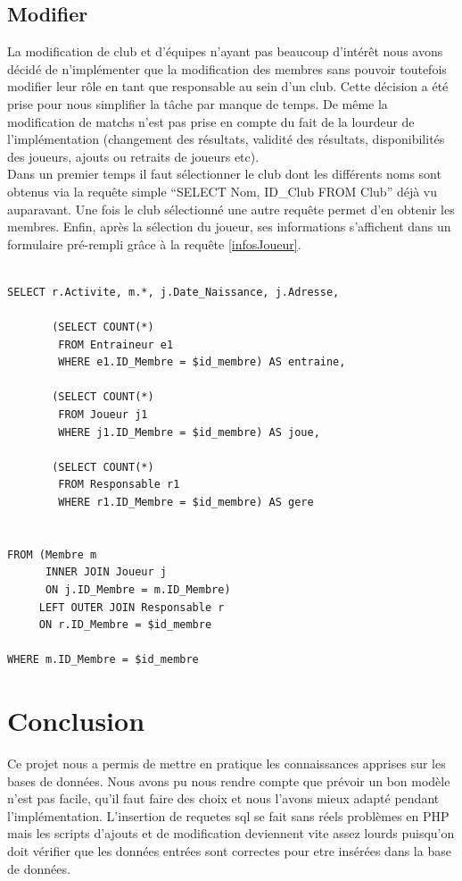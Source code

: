 \documentclass[a4paper»,8pt,french,fleqn]{report}
\begin{document}
\section{Modifier}

La modification de club et d'équipes n'ayant pas beaucoup d'intérêt nous avons décidé de n'implémenter que la modification des membres sans pouvoir toutefois modifier leur rôle en tant que responsable au sein d'un club. Cette décision a été prise pour nous simplifier la tâche par manque de temps. De même la modification de matchs n'est pas prise en compte du fait de la lourdeur de l'implémentation (changement des résultats, validité des résultats, disponibilités des joueurs, ajouts ou retraits de joueurs etc). \\

Dans un premier temps il faut sélectionner le club dont les différents noms sont obtenus via la requête simple ``SELECT Nom, ID\_Club FROM Club'' déjà vu auparavant. Une fois le club sélectionné une autre requête permet d'en obtenir les membres. Enfin, après la sélection du joueur, ses informations s'affichent dans un formulaire pré-rempli grâce à la requête \ref{infosJoueur}.

\begin{lstlisting}

SELECT r.Activite, m.*, j.Date_Naissance, j.Adresse,

       (SELECT COUNT(*) 
        FROM Entraineur e1
        WHERE e1.ID_Membre = $id_membre) AS entraine,

       (SELECT COUNT(*)
        FROM Joueur j1
        WHERE j1.ID_Membre = $id_membre) AS joue,

       (SELECT COUNT(*)
        FROM Responsable r1
        WHERE r1.ID_Membre = $id_membre) AS gere


FROM (Membre m 
      INNER JOIN Joueur j
      ON j.ID_Membre = m.ID_Membre)
     LEFT OUTER JOIN Responsable r
     ON r.ID_Membre = $id_membre
     
WHERE m.ID_Membre = $id_membre

\end{lstlisting}  

\chapter*{Conclusion}

Ce projet nous a permis de mettre en pratique les connaissances apprises sur les bases de données. Nous avons pu nous rendre compte que prévoir un bon modèle n'est pas facile, qu'il faut faire des choix et nous l'avons mieux adapté pendant l'implémentation. L'insertion de requetes sql se fait sans réels problèmes en PHP mais les scripts d'ajouts et de modification deviennent vite assez lourds puisqu'on doit vérifier que les données entrées sont correctes pour etre insérées dans la base de données.  
\end{document}
